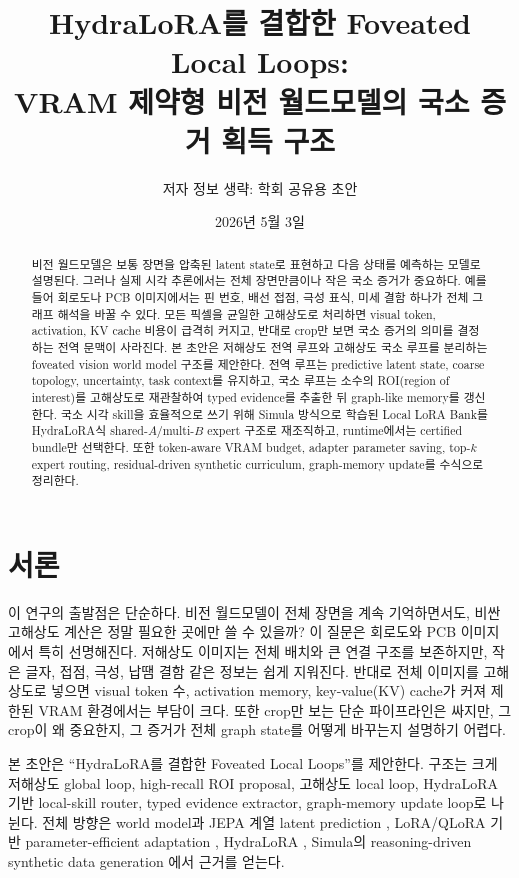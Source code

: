 \documentclass[11pt]{article}
\title{HydraLoRA를 결합한 Foveated Local Loops:\\
VRAM 제약형 비전 월드모델의 국소 증거 획득 구조}
\author{저자 정보 생략: 학회 공유용 초안}
\date{2026년 5월 3일}
\theoremstyle{definition}
\begin{document}
\maketitle

\begin{abstract}
비전 월드모델은 보통 장면을 압축된 latent state로 표현하고 다음 상태를 예측하는 모델로 설명된다.
그러나 실제 시각 추론에서는 전체 장면만큼이나 작은 국소 증거가 중요하다.
예를 들어 회로도나 PCB 이미지에서는 핀 번호, 배선 접점, 극성 표식, 미세 결함 하나가 전체 그래프 해석을 바꿀 수 있다.
모든 픽셀을 균일한 고해상도로 처리하면 visual token, activation, KV cache 비용이 급격히 커지고, 반대로 crop만 보면 국소 증거의 의미를 결정하는 전역 문맥이 사라진다.
본 초안은 저해상도 전역 루프와 고해상도 국소 루프를 분리하는 foveated vision world model 구조를 제안한다.
전역 루프는 predictive latent state, coarse topology, uncertainty, task context를 유지하고, 국소 루프는 소수의 ROI(region of interest)를 고해상도로 재관찰하여 typed evidence를 추출한 뒤 graph-like memory를 갱신한다.
국소 시각 skill을 효율적으로 쓰기 위해 Simula 방식으로 학습된 Local LoRA Bank를 HydraLoRA식 shared-$A$/multi-$B$ expert 구조로 재조직하고, runtime에서는 certified bundle만 선택한다.
또한 token-aware VRAM budget, adapter parameter saving, top-$k$ expert routing, residual-driven synthetic curriculum, graph-memory update를 수식으로 정리한다.
\end{abstract}

\section{서론}

이 연구의 출발점은 단순하다.
비전 월드모델이 전체 장면을 계속 기억하면서도, 비싼 고해상도 계산은 정말 필요한 곳에만 쓸 수 있을까?
이 질문은 회로도와 PCB 이미지에서 특히 선명해진다.
저해상도 이미지는 전체 배치와 큰 연결 구조를 보존하지만, 작은 글자, 접점, 극성, 납땜 결함 같은 정보는 쉽게 지워진다.
반대로 전체 이미지를 고해상도로 넣으면 visual token 수, activation memory, key-value(KV) cache가 커져 제한된 VRAM 환경에서는 부담이 크다.
또한 crop만 보는 단순 파이프라인은 싸지만, 그 crop이 왜 중요한지, 그 증거가 전체 graph state를 어떻게 바꾸는지 설명하기 어렵다.

본 초안은 ``HydraLoRA를 결합한 Foveated Local Loops''를 제안한다.
구조는 크게 저해상도 global loop, high-recall ROI proposal, 고해상도 local loop, HydraLoRA 기반 local-skill router, typed evidence extractor, graph-memory update loop로 나뉜다.
전체 방향은 world model과 JEPA 계열 latent prediction \citep{ha2018worldmodels,hafner2023dreamerv3,assran2023ijepa,bardes2024vjepa,maes2026leworldmodel}, LoRA/QLoRA 기반 parameter-efficient adaptation \citep{hu2021lora,dettmers2023qlora}, HydraLoRA \citep{tian2024hydralora}, Simula의 reasoning-driven synthetic data generation \citep{davidson2026simula}에서 근거를 얻는다.
\end{document}
